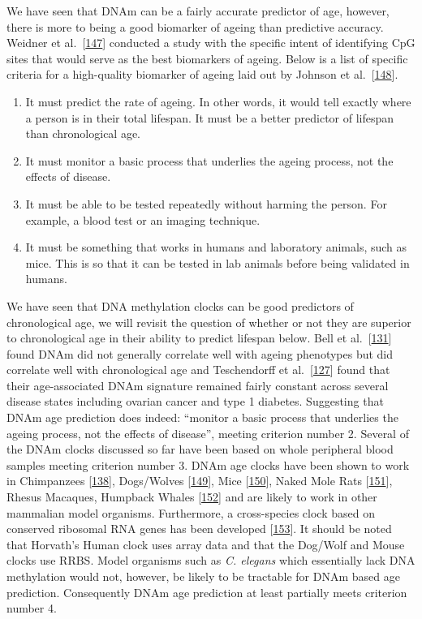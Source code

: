 \documentclass[
]{book}
\providecommand{\tightlist}{%
  \setlength{\itemsep}{0pt}\setlength{\parskip}{0pt}}
\begin{document}
We have seen that DNAm can be a fairly accurate predictor of age, however, there is more to being a good biomarker of ageing than predictive accuracy.
Weidner et al.~{[}\protect\hyperlink{ref-Weidner2014}{147}{]} conducted a study with the specific intent of identifying CpG sites that would serve as the best biomarkers of ageing.
Below is a list of specific criteria for a high-quality biomarker of ageing laid out by Johnson et al.~{[}\protect\hyperlink{ref-Johnson2006}{148}{]}.

\begin{enumerate}
\def\labelenumi{\arabic{enumi}.}
\tightlist
\item
  It must predict the rate of ageing. In other words, it would tell exactly where a person is in their total lifespan. It must be a better predictor of lifespan than chronological age.
\item
  It must monitor a basic process that underlies the ageing process, not the effects of disease.
\item
  It must be able to be tested repeatedly without harming the person. For example, a blood test or an imaging technique.
\item
  It must be something that works in humans and laboratory animals, such as mice. This is so that it can be tested in lab animals before being validated in humans.
\end{enumerate}

We have seen that DNA methylation clocks can be good predictors of chronological age, we will revisit the question of whether or not they are superior to chronological age in their ability to predict lifespan below.
Bell et al.~{[}\protect\hyperlink{ref-Bell2012}{131}{]} found DNAm did not generally correlate well with ageing phenotypes but did correlate well with chronological age and Teschendorff et al.~{[}\protect\hyperlink{ref-Teschendorff2010}{127}{]} found that their age-associated DNAm signature remained fairly constant across several disease states including ovarian cancer and type 1 diabetes.
Suggesting that DNAm age prediction does indeed: ``monitor a basic process that underlies the ageing process, not the effects of disease'', meeting criterion number 2.
Several of the DNAm clocks discussed so far have been based on whole peripheral blood samples meeting criterion number 3. DNAm age clocks have been shown to work in Chimpanzees {[}\protect\hyperlink{ref-Horvath2013}{138}{]}, Dogs/Wolves {[}\protect\hyperlink{ref-Thompson2017}{149}{]}, Mice {[}\protect\hyperlink{ref-Stubbs2017}{150}{]}, Naked Mole Rats {[}\protect\hyperlink{ref-Lowe2020}{151}{]}, Rhesus Macaques, Humpback Whales {[}\protect\hyperlink{ref-Lowe2018}{152}{]} and are likely to work in other mammalian model organisms.
Furthermore, a cross-species clock based on conserved ribosomal RNA genes has been developed {[}\protect\hyperlink{ref-Wang2019}{153}{]}.
It should be noted that Horvath's Human clock uses array data and that the Dog/Wolf and Mouse clocks use RRBS.
Model organisms such as \emph{C. elegans} which essentially lack DNA methylation would not, however, be likely to be tractable for DNAm based age prediction.
Consequently DNAm age prediction at least partially meets criterion number 4.
\end{document}
